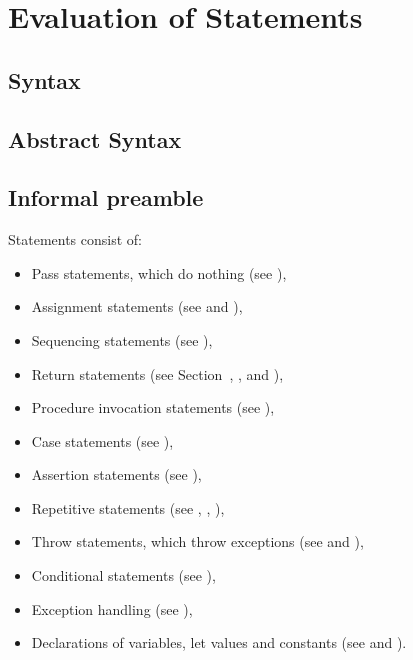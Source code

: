 \documentclass{book}
\begin{document}

\chapter{Evaluation of Statements \label{chap:eval_stmt}}

\section{Syntax}

\section{Abstract Syntax}


\section{Informal preamble}
Statements consist of:
\begin{itemize}
\item Pass statements, which do nothing (see ),
\item Assignment statements (see  and ),
\item Sequencing statements (see ),
\item Return statements (see Section~\label{sec:ReturnStatements}, ,  and ),
\item Procedure invocation statements (see ),
\item Case statements (see ),
\item Assertion statements (see ),
\item Repetitive statements (see , , ),
\item Throw statements, which throw exceptions (see  and ),
\item Conditional statements (see ),
\item Exception handling (see ),
\item Declarations of variables, let values and constants (see  and ).
\end{itemize}
\end{document}
